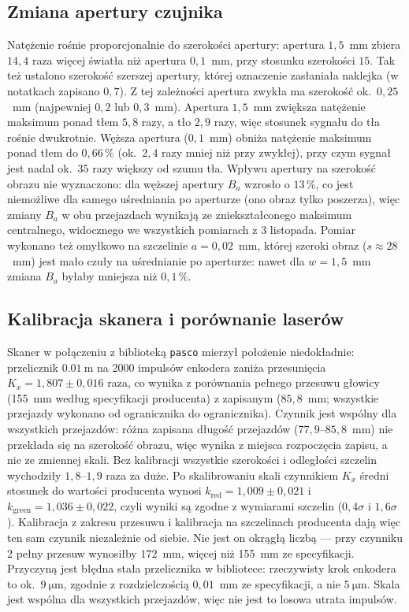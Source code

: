 \documentclass[12pt, a4paper]{article}
\begin{document}
\subsection{Zmiana apertury czujnika}

Natężenie rośnie proporcjonalnie do szerokości apertury: apertura $1{,}5$~mm zbiera $14{,}4$ raza
więcej światła niż apertura $0{,}1$~mm, przy stosunku szerokości $15$. Tak też ustalono szerokość
szerszej apertury, której oznaczenie zasłaniała naklejka (w notatkach zapisano $0{,}7$). Z tej zależności apertura
zwykła ma szerokość ok.\ $0{,}25$~mm (najpewniej $0{,}2$ lub $0{,}3$~mm). Apertura $1{,}5$~mm zwiększa natężenie maksimum ponad tłem $5{,}8$ razy,
a tło $2{,}9$ razy, więc stosunek sygnału do tła rośnie dwukrotnie. Węższa apertura ($0{,}1$~mm) obniża natężenie
maksimum ponad tłem do $0{,}66\,\%$ (ok.\ $2{,}4$ razy mniej niż przy zwykłej), przy czym sygnał
jest nadal ok.\ $35$ razy większy od szumu tła. Wpływu apertury na szerokość obrazu nie
wyznaczono: dla węższej apertury $B_a$ wzrosło o $13\,\%$, co jest niemożliwe dla samego
uśredniania po aperturze (ono obraz tylko poszerza), więc zmiany $B_a$ w obu przejazdach
wynikają ze zniekształconego maksimum centralnego, widocznego we wszystkich pomiarach
z 3 listopada. Pomiar wykonano też omyłkowo na szczelinie $a = 0{,}02$~mm, której szeroki
obraz ($s \approx 28$~mm) jest mało czuły na uśrednianie po aperturze: nawet dla $w = 1{,}5$~mm
zmiana $B_a$ byłaby mniejsza niż $0{,}1\,\%$.

\subsection{Kalibracja skanera i porównanie laserów}
\label{sec:scale_concl}

Skaner w połączeniu z biblioteką \texttt{pasco} mierzył położenie niedokładnie: przelicznik
$\SI{0.01}{\meter}$ na 2000 impulsów enkodera zaniża przesunięcia
$K_x = 1{,}807 \pm 0{,}016$ raza, co wynika z porównania pełnego przesuwu głowicy (155~mm według
specyfikacji producenta) z zapisanym ($85{,}8$~mm; wszystkie przejazdy wykonano od ogranicznika
do ogranicznika). Czynnik jest wspólny dla wszystkich przejazdów: różna zapisana długość
przejazdów ($77{,}9$--$85{,}8$~mm) nie przekłada się na szerokość obrazu, więc wynika z miejsca
rozpoczęcia zapisu, a nie ze zmiennej skali. Bez kalibracji wszystkie szerokości
i odległości szczelin wychodziły $1{,}8$--$1{,}9$ raza za duże. Po skalibrowaniu skali
czynnikiem $K_x$ średni stosunek do wartości producenta wynosi $k_\text{red} = 1{,}009 \pm 0{,}021$
i $k_\text{green} = 1{,}036 \pm 0{,}022$, czyli wyniki są zgodne z wymiarami szczelin
($0{,}4\sigma$ i $1{,}6\sigma$). Kalibracja z zakresu przesuwu i kalibracja na szczelinach
producenta dają więc ten sam czynnik niezależnie od siebie. Nie jest on okrągłą liczbą --- przy
czynniku 2 pełny przesuw wynosiłby $172$~mm, więcej niż 155~mm ze specyfikacji. Przyczyną jest
błędna stała przelicznika w bibliotece: rzeczywisty krok enkodera to ok.\ $\SI{9}{\micro\meter}$,
zgodnie z rozdzielczością $0{,}01$~mm ze specyfikacji, a nie $\SI{5}{\micro\meter}$. Skala jest
wspólna dla wszystkich przejazdów, więc nie jest to losowa utrata impulsów.
\end{document}
